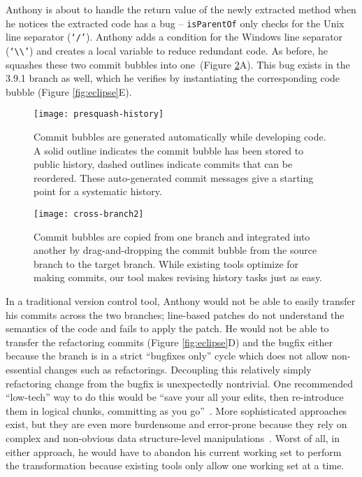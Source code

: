 \documentclass[conference]{IEEEtran}
\begin{document}
Anthony is about to handle the return value of the newly extracted method when he notices the extracted code has a bug -- \texttt{isParentOf} only checks for the Unix line separator (\texttt{`/'}).
Anthony adds a condition for the Windows line separator (\texttt{`\textbackslash\textbackslash'}) and creates a local variable to reduce redundant code.
As before, he squashes these two commit bubbles into one~(Figure \ref{fig:cross-branch}A).
This bug exists in the 3.9.1 branch as well, which he verifies by instantiating the corresponding code bubble (Figure \ref{fig:eclipse}E).

\begin{figure}
\centering
\texttt{[image: presquash-history]}
\caption{Commit bubbles are generated automatically while developing code. 
A solid outline indicates the commit bubble has been stored to public history, dashed outlines indicate commits that can be reordered.
These auto-generated commit messages give a starting point for a systematic history.}
\label{fig:presquash-history}
\end{figure}

\begin{figure}[h]
\centering
\texttt{[image: cross-branch2]}
\caption{Commit bubbles are copied from one branch and integrated into another by drag-and-dropping the commit bubble from the source branch to the target branch.
While existing tools optimize for making commits, our tool makes revising history tasks just as easy.
}
\label{fig:cross-branch}
\end{figure}
In a traditional version control tool, Anthony would not be able to easily transfer his commits across the two branches;
line-based patches do not understand the semantics of the code and fails to apply the patch.
He would not be able to transfer the refactoring commits (Figure \ref{fig:eclipse}D) and the bugfix either because the branch is in a strict ``bugfixes only'' cycle which does not allow non-essential changes such as refactorings.
Decoupling this relatively simply refactoring change from the bugfix is unexpectedly nontrivial.
One recommended ``low-tech'' way to do this would be ``save your all your edits, then re-introduce them in logical chunks, committing as you go''~\cite{GitBestPractices}.
More sophisticated approaches exist, but they are even more burdensome and error-prone because they rely on complex and non-obvious data structure-level manipulations~\cite{SausageMaking}.
Worst of all, in either approach, he would have to abandon his current working set to perform the transformation because existing tools only allow one working set at a time.
\end{document}
